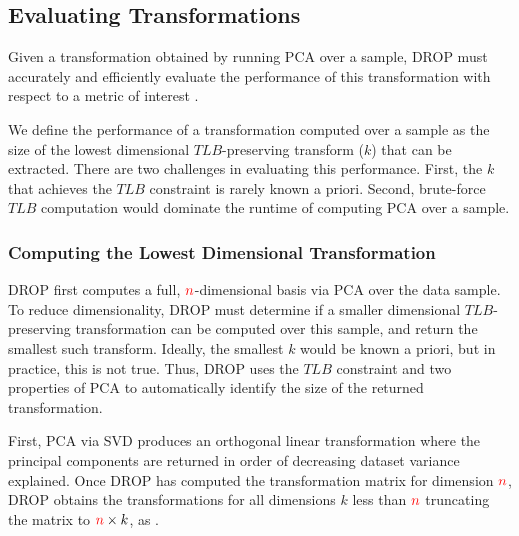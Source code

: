 \subsection{Evaluating Transformations}
\label{subsec:teval}
Given a transformation obtained by running PCA over a sample, DROP must accurately and efficiently evaluate the performance of this transformation with respect to a metric of interest . 

We define the performance of a transformation computed over a sample as the size of the lowest dimensional $TLB$-preserving transform ($k$) that can be extracted.
There are two challenges in evaluating this performance.
First, the $k$ that achieves the $TLB$ constraint is rarely known a priori. 
Second, brute-force $TLB$ computation would dominate the runtime of computing PCA over a sample.

\subsubsection{Computing the Lowest Dimensional Transformation}

DROP first computes a full, ${\color{red}n}$-dimensional basis via PCA over the data sample.
To reduce dimensionality, DROP must determine if a smaller dimensional $TLB$-preserving transformation can be computed over this sample, and return the smallest such transform. 
Ideally, the smallest $k$ would be known a priori, but in practice, this is not true.   
Thus, DROP uses the $TLB$ constraint and two properties of PCA to automatically identify the size of the returned transformation.

First, PCA via SVD produces an orthogonal linear transformation where the principal components  are returned in order of decreasing dataset variance explained.
Once DROP has computed the transformation matrix for dimension ${\color{red}n}$, DROP obtains the transformations for all dimensions $k$ less than ${\color{red}n}$ truncating the matrix to ${\color{red}n} \times k$, as .

